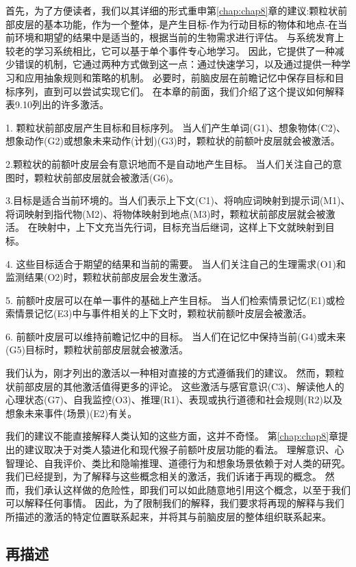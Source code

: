 首先，为了方便读者，我们以其详细的形式重申第\ref{chap:chap8}章的建议:颗粒状前部皮层的基本功能，作为一个整体，是产生目标-作为行动目标的物体和地点-在当前环境和期望的结果中是适当的，根据当前的生物需求进行评估。
与系统发育上较老的学习系统相比，它可以基于单个事件专心地学习。
因此，它提供了一种减少错误的机制，它通过两种方式做到这一点：通过快速学习，以及通过提供一种学习和应用抽象规则和策略的机制。
必要时，前脑皮层在前瞻记忆中保存目标和目标序列，直到可以尝试实现它们。
在本章的前面，我们介绍了这个提议如何解释表9.10列出的许多激活。


1. 颗粒状前部皮层产生目标和目标序列。
当人们产生单词(G1)、想象物体(C2)、想象动作(G2)或想象未来动作(计划)(G3)时，颗粒状的前额叶皮层就会被激活。


2.颗粒状的前额叶皮层会有意识地而不是自动地产生目标。
当人们关注自己的意图时，颗粒状前部皮层就会被激活(G6)。


3.目标是适合当前环境的。当人们表示上下文(C1)、将响应词映射到提示词(M1)、将词映射到指代物(M2)、将物体映射到地点(M3)时，颗粒状前部皮层就会被激活。
在映射中，上下文充当先行词，目标充当后继词，这样上下文就映射到目标。


4. 这些目标适合于期望的结果和当前的需要。
当人们关注自己的生理需求(O1)和监测结果(O2)时，颗粒状前部皮层会发生激活。


5. 前额叶皮层可以在单一事件的基础上产生目标。
当人们检索情景记忆(E1)或检索情景记忆(E3)中与事件相关的上下文时，颗粒状前额叶皮层会被激活。


6. 前额叶皮层可以维持前瞻记忆中的目标。
当人们在记忆中保持当前(G4)或未来(G5)目标时，颗粒状前部皮层就会被激活。


我们认为，刚才列出的激活以一种相对直接的方式遵循我们的建议。
然而，颗粒状前部皮层的其他激活值得更多的评论。
这些激活与感官意识(C3)、解读他人的心理状态(G7)、自我监控(O3)、推理(R1)、表现或执行道德和社会规则(R2)以及想象未来事件(场景)(E2)有关。


我们的建议不能直接解释人类认知的这些方面，这并不奇怪。
第\ref{chap:chap8}章提出的建议取决于对类人猿进化和现代猴子前额叶皮层功能的看法。
理解意识、心智理论、自我评价、类比和隐喻推理、道德行为和想象场景依赖于对人类的研究。
我们已经提到，为了解释与这些概念相关的激活，我们诉诸于再现的概念。
然而，我们承认这样做的危险性，即我们可以如此随意地引用这个概念，以至于我们可以解释任何事情。
因此，为了限制我们的解释，我们要求将再现的解释与我们所描述的激活的特定位置联系起来，并将其与前脑皮层的整体组织联系起来。



\subsection{再描述}

